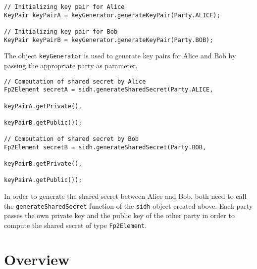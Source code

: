 \begin{lstlisting}[]
// Initializing key pair for Alice
KeyPair keyPairA = keyGenerator.generateKeyPair(Party.ALICE);

// Initializing key pair for Bob
KeyPair keyPairB = keyGenerator.generateKeyPair(Party.BOB);
\end{lstlisting}
The object \texttt{keyGenerator} is used to generate key pairs for Alice and Bob by passing the appropriate party as parameter.\\

\begin{lstlisting}[]
// Computation of shared secret by Alice
Fp2Element secretA = sidh.generateSharedSecret(Party.ALICE,
													keyPairA.getPrivate(), 
													keyPairB.getPublic());

// Computation of shared secret by Bob
Fp2Element secretB = sidh.generateSharedSecret(Party.BOB, 
													keyPairB.getPrivate(), 
													keyPairA.getPublic());
\end{lstlisting}
In order to generate the shared secret between Alice and Bob, both need to call the \texttt{generateSharedSecret} function of the \texttt{sidh} object created above. Each party passes the own private key and the public key of the other party in order to compute the shared secret of type \texttt{Fp2Element}.

\section{Overview}


